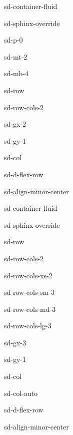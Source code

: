 \documentclass[letterpaper,10pt,italian]{jupyterBook}
\begin{document}
\begin{sphinxuseclass}{sd-container-fluid}
\begin{sphinxuseclass}{sd-sphinx-override}
\begin{sphinxuseclass}{sd-p-0}
\begin{sphinxuseclass}{sd-mt-2}
\begin{sphinxuseclass}{sd-mb-4}
\begin{sphinxuseclass}{sd-row}
\begin{sphinxuseclass}{sd-row-cols-2}
\begin{sphinxuseclass}{sd-gx-2}
\begin{sphinxuseclass}{sd-gy-1}
\begin{sphinxuseclass}{sd-col}
\begin{sphinxuseclass}{sd-d-flex-row}
\begin{sphinxuseclass}{sd-align-minor-center}
\begin{sphinxuseclass}{sd-container-fluid}
\begin{sphinxuseclass}{sd-sphinx-override}
\begin{sphinxuseclass}{sd-row}
\begin{sphinxuseclass}{sd-row-cols-2}
\begin{sphinxuseclass}{sd-row-cols-xs-2}
\begin{sphinxuseclass}{sd-row-cols-sm-3}
\begin{sphinxuseclass}{sd-row-cols-md-3}
\begin{sphinxuseclass}{sd-row-cols-lg-3}
\begin{sphinxuseclass}{sd-gx-3}
\begin{sphinxuseclass}{sd-gy-1}
\begin{sphinxuseclass}{sd-col}
\begin{sphinxuseclass}{sd-col-auto}
\begin{sphinxuseclass}{sd-d-flex-row}
\begin{sphinxuseclass}{sd-align-minor-center}
\end{sphinxuseclass}
\end{sphinxuseclass}
\end{sphinxuseclass}
\end{sphinxuseclass}
\end{sphinxuseclass}
\end{sphinxuseclass}
\end{sphinxuseclass}
\end{sphinxuseclass}
\end{sphinxuseclass}
\end{sphinxuseclass}
\end{sphinxuseclass}
\end{sphinxuseclass}
\end{sphinxuseclass}
\end{sphinxuseclass}
\end{sphinxuseclass}
\end{sphinxuseclass}
\end{sphinxuseclass}
\end{sphinxuseclass}
\end{sphinxuseclass}
\end{sphinxuseclass}
\end{sphinxuseclass}
\end{sphinxuseclass}
\end{sphinxuseclass}
\end{sphinxuseclass}
\end{sphinxuseclass}
\end{sphinxuseclass}
\end{document}
